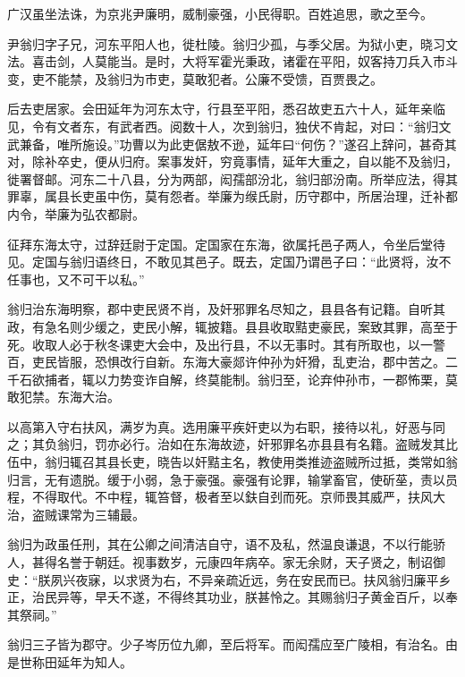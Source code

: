 \documentclass[12pt,UTF8]{ctexbook}
\begin{document}
广汉虽坐法诛，为京兆尹廉明，威制豪强，小民得职。百姓追思，歌之至今。



尹翁归字子兄，河东平阳人也，徙杜陵。翁归少孤，与季父居。为狱小吏，晓习文法。喜击剑，人莫能当。是时，大将军霍光秉政，诸霍在平阳，奴客持刀兵入市斗变，吏不能禁，及翁归为市吏，莫敢犯者。公廉不受馈，百贾畏之。



后去吏居家。会田延年为河东太守，行县至平阳，悉召故吏五六十人，延年亲临见，令有文者东，有武者西。阅数十人，次到翁归，独伏不肯起，对曰：“翁归文武兼备，唯所施设。”功曹以为此吏倨敖不逊，延年曰“何伤？”遂召上辞问，甚奇其对，除补卒史，便从归府。案事发奸，穷竟事情，延年大重之，自以能不及翁归，徙署督邮。河东二十八县，分为两部，闳孺部汾北，翁归部汾南。所举应法，得其罪辜，属县长吏虽中伤，莫有怨者。举廉为缑氏尉，历守郡中，所居治理，迁补都内令，举廉为弘农都尉。



征拜东海太守，过辞廷尉于定国。定国家在东海，欲属托邑子两人，令坐后堂待见。定国与翁归语终日，不敢见其邑子。既去，定国乃谓邑子曰：“此贤将，汝不任事也，又不可干以私。”



翁归治东海明察，郡中吏民贤不肖，及奸邪罪名尽知之，县县各有记籍。自听其政，有急名则少缓之，吏民小解，辄披籍。县县收取黠吏豪民，案致其罪，高至于死。收取人必于秋冬课吏大会中，及出行县，不以无事时。其有所取也，以一警百，吏民皆服，恐惧改行自新。东海大豪郯许仲孙为奸猾，乱吏治，郡中苦之。二千石欲捕者，辄以力势变诈自解，终莫能制。翁归至，论弃仲孙市，一郡怖栗，莫敢犯禁。东海大治。



以高第入守右扶风，满岁为真。选用廉平疾奸吏以为右职，接待以礼，好恶与同之；其负翁归，罚亦必行。治如在东海故迹，奸邪罪名亦县县有名籍。盗贼发其比伍中，翁归辄召其县长吏，晓告以奸黠主名，教使用类推迹盗贼所过抵，类常如翁归言，无有遗脱。缓于小弱，急于豪强。豪强有论罪，输掌畜官，使斫莝，责以员程，不得取代。不中程，辄笞督，极者至以鈇自刭而死。京师畏其威严，扶风大治，盗贼课常为三辅最。



翁归为政虽任刑，其在公卿之间清洁自守，语不及私，然温良谦退，不以行能骄人，甚得名誉于朝廷。视事数岁，元康四年病卒。家无余财，天子贤之，制诏御史：“朕夙兴夜寐，以求贤为右，不异亲疏近远，务在安民而已。扶风翁归廉平乡正，治民异等，早夭不遂，不得终其功业，朕甚怜之。其赐翁归子黄金百斤，以奉其祭祠。”



翁归三子皆为郡守。少子岑历位九卿，至后将军。而闳孺应至广陵相，有治名。由是世称田延年为知人。
\end{document}
